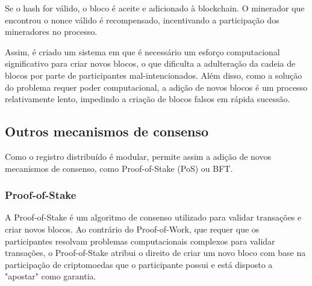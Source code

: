 \documentclass[conference]{IEEEtran}
\begin{document}
    Se o hash for válido, o bloco é aceite e adicionado à blockchain. O minerador que encontrou o nonce válido é recompensado, incentivando a participação dos mineradores no processo.

    Assim, é criado um sistema em que é necessário um esforço computacional significativo para criar novos blocos, o que dificulta a adulteração da cadeia de blocos por parte de participantes mal-intencionados. Além disso, como a solução do problema requer poder computacional, a adição de novos blocos é um processo relativamente lento, impedindo a criação de blocos falsos em rápida sucessão.

    \subsection{Outros mecanismos de consenso}
    Como o registro distribuído é modular, permite assim a adição de novos mecanismos de consenso, como Proof-of-Stake (PoS) ou BFT.
    \subsubsection{Proof-of-Stake}
    A Proof-of-Stake é um algoritmo de consenso utilizado para validar transações e criar novos blocos. Ao contrário do Proof-of-Work, que requer que os participantes resolvam problemas computacionais complexos para validar transações, o Proof-of-Stake atribui o direito de criar um novo bloco com base na participação de criptomoedas que o participante possui e está disposto a "apostar" como garantia.
\end{document}

